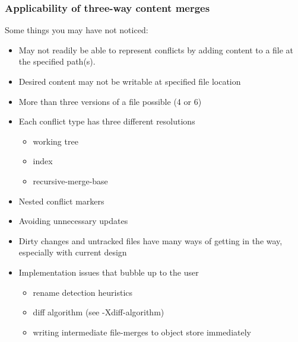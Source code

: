 \documentclass[t]{beamer}
\begin{document}
\begin{frame}
  \frametitle{Applicability of three-way content merges}

  Some things you may have not noticed:
  \begin{itemize}[<+->]
    \item May not readily be able to represent conflicts by adding content
          to a file at the specified path(s).
    \item Desired content may not be writable at specified file location
    \item More than three versions of a file possible (4 or 6)
    \item Each conflict type has three different resolutions
    \begin{itemize}
      \item working tree
      \item index
      \item recursive-merge-base
    \end{itemize}
    \item Nested conflict markers
    \item Avoiding unnecessary updates
    \item Dirty changes and untracked files have many ways of getting
          in the way, especially with current design
    \item Implementation issues that bubble up to the user
    \begin{itemize}
      \item rename detection heuristics
      \item diff algorithm (see -Xdiff-algorithm)
      \item writing intermediate file-merges to object store immediately
    \end{itemize}
  \end{itemize}

\end{frame}

\end{document}

